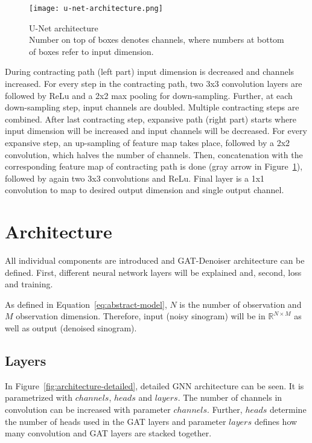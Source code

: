 \begin{figure}[H]
  \centering
  \texttt{[image: u-net-architecture.png]}
  \caption{
    U-Net architecture \cite[p 2, Fig. 1]{unet-tomography} \\
    Number on top of boxes denotes channels, where numbers at bottom of boxes refer to input dimension.
    }
    \label{fig:u-net-architectue}
\end{figure}


During contracting path (left part) input dimension is decreased and channels increased.
For every step in the contracting path, two 3x3 convolution layers are followed by ReLu
and a 2x2 max pooling for down-sampling. Further, at each down-sampling step, input channels are doubled.
Multiple contracting steps are combined. After last contracting step, expansive path (right part) starts
where input dimension will be increased and input channels will be decreased.
For every expansive step, an up-sampling of feature map takes place, followed by a 2x2 convolution, 
which halves the number of channels. Then, concatenation with the corresponding feature
map of contracting path is done (gray arrow in Figure~\ref{fig:u-net-architectue}), followed by again two 3x3 convolutions and ReLu.
Final layer is a 1x1 convolution to map to desired output dimension and single output channel.

\section{Architecture}
\label{sec:architecture-GatDenoiser}
All individual components are introduced and GAT-Denoiser architecture can be defined.
First, different neural network layers will be explained and, second, loss and training.

As defined in Equation~\ref{eq:abstract-model}, $N$ is the number of observation and
$M$ observation dimension. 
Therefore, input (noisy sinogram) will be in $\mathbb{R}^{N \times M}$ as well as output (denoised sinogram). 

\subsection{Layers}
In Figure~\ref{fig:architecture-detailed}, detailed GNN architecture can be seen.
It is parametrized with $channels$, $heads$ and $layers$. 
The number of channels in convolution can be increased with parameter $channels$.
Further, $heads$ determine the number of heads used in the GAT layers and parameter 
$layers$ defines how many convolution and GAT layers are stacked together.


